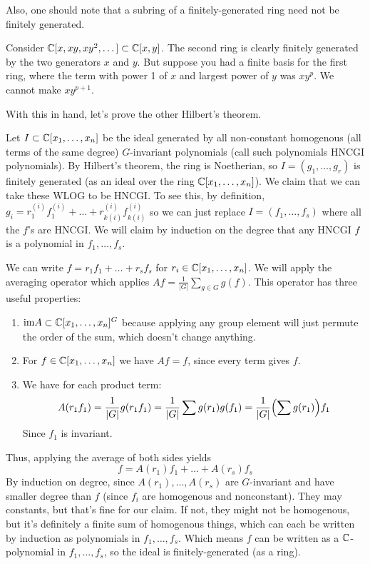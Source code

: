Also, one should note that a subring of a finitely-generated ring need not be finitely generated.
\begin{example}
    Consider $\operatorname{\mathbb{C}}[x, xy, xy^2, \dots] \subset \operatorname{\mathbb{C}}[x, y]$. The second ring is clearly finitely generated
    by the two generators $x$ and $y$. But suppose you had a finite basis for the first ring, where the term with power 1 of $x$ and largest power of $y$ was $xy^p$.
    We cannot make $xy^{p+1}$.
\end{example}
With this in hand, let's prove the other Hilbert's theorem.
\begin{proof*}
    Let $I \subset \operatorname{\mathbb{C}}[x_1, \dots, x_n]$ be the ideal generated by
    all non-constant homogenous (all terms of the same degree)
    $G$-invariant polynomials (call such polynomials HNCGI polynomials). By Hilbert's theorem, the ring is Noetherian,
    so $I = (g_1, \dots, g_r)$ is finitely generated (as an ideal over the ring $\operatorname{\mathbb{C}}[x_1, \dots, x_n]$).
    We claim that we can take these WLOG to be HNCGI.
    To see this, by definition,
    $g_i = r_1^{(i)} f_1^{(i)} + \dots + r_{k(i)}^{(i)} f_{k(i)}^{(i)}$
    so we can just replace $I = (f_1, \dots, f_s)$ where all the $f$'s are HNCGI. We will claim by induction on the
    degree that any HNCGI $f$ is a polynomial in $f_1, \dots, f_s$.

    We can write $f = r_1 f_1 + \dots + r_s f_s$ for $r_i \in \operatorname{\mathbb{C}}[x_1, \dots, x_n]$. We will apply
    the averaging operator which applies $Af = \frac{1}{|G|} \sum_{g \in G} g(f)$. This operator has
    three useful properties:
    \begin{enumerate}
        \item $\textrm{im} A \subset \operatorname{\mathbb{C}}[x_1, \dots, x_n]^G$ because applying any group element
    will just permute the order of the sum, which doesn't change anything.
        \item For $f \in \operatorname{\mathbb{C}}[x_1, \dots, x_n]$ we have $Af = f$, since every term gives $f$.
        \item We have for each product term:
        \[ A(r_1 f_1) = \frac{1}{|G|} g(r_1 f_1) = \frac{1}{|G|} \sum g(r_1) g(f_1) = \frac{1}{|G|} \qty(\sum g(r_1)) f_1\]
        Since $f_1$ is invariant.
    \end{enumerate}
    Thus, applying the average of both sides yields
    \[ f = A(r_1) f_1 + \dots + A(r_s) f_s \]
    By induction on degree, since $A(r_1), \dots, A(r_s)$ are $G$-invariant
    and have smaller degree than $f$ (since $f_i$ are homogenous and nonconstant).
    They may constants, but that's fine for our claim. If not,
    they might not be homogenous, but it's definitely a finite sum of homogenous things,
    which can each be written by induction as polynomials in $f_1, \dots, f_s$.
    Which means $f$ can be written as a $\operatorname{\mathbb{C}}$-polynomial in $f_1, \dots, f_s$, so the ideal is
    finitely-generated (as a ring).
\end{proof*}

